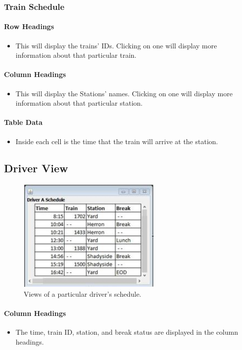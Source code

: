 \documentclass[letterpaper]{article}
\begin{document}
\subsubsection{Train Schedule}
\paragraph{Row Headings}
\begin{itemize}
	\item This will display the trains' IDs. Clicking on one will display more information about that particular train.
\end{itemize}
\paragraph{Column Headings}
\begin{itemize}
	\item This will display the Stations' names. Clicking on one will display more information about that particular station.
\end{itemize}
\paragraph{Table Data}
\begin{itemize}
	\item Inside each cell is the time that the train will arrive at the station.
\end{itemize}

\subsection{Driver View}

\begin{figure}[h!]
	\center
	\includegraphics[width=7cm]{driver_view}
	\caption{Views of a particular driver's schedule.}
\end{figure}

\paragraph{Column Headings}
\begin{itemize}
	\item The time, train ID, station, and break status are displayed in the column headings.
\end{itemize}
\end{document}

